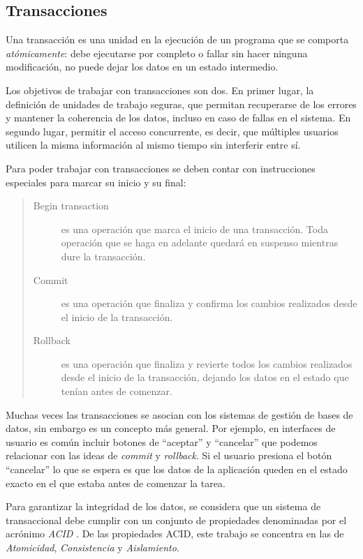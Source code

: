 \subsection{Transacciones}	

Una transacción es una unidad en la ejecución de un programa que se comporta 
\emph{atómicamente}: debe ejecutarse por completo o fallar sin hacer ninguna
modificación, no puede dejar los datos en un estado intermedio.

Los objetivos de trabajar con transacciones son dos.
En primer lugar, la definición de unidades de trabajo seguras, que permitan 
recuperarse de los errores y mantener la coherencia de los datos, incluso en caso de fallas en el sistema.
En segundo lugar, permitir el acceso concurrente, es decir, que múltiples
usuarios utilicen la misma información al mismo tiempo sin interferir entre sí.

\medskip
Para poder trabajar con transacciones se deben contar con instrucciones
especiales para marcar su inicio y su final:
\begin{quote}
	\label{ctxTransactional}
	\begin{description}
		\item[Begin transaction] es una operación que marca el inicio de una
		transacción. Toda operación que se haga en adelante quedará en suspenso
		mientras dure la transacción.
	
		\item[Commit] es una operación que finaliza y confirma los
		cambios realizados desde el inicio de la transacción. 
		
		\item[Rollback] es una operación que finaliza y revierte todos los cambios
		realizados desde el inicio de la transacción, 
		dejando los datos en el estado que tenían antes de comenzar.
	\end{description}
\end{quote}
   
\bigskip

Muchas veces las transacciones se asocian con los sistemas de gestión de bases
de datos, sin embargo es un concepto más general.
Por ejemplo, en interfaces de usuario es común incluir botones de
``aceptar'' y ``cancelar'' que podemos relacionar con las ideas de
\emph{commit} y \emph{rollback}. 
Si el usuario presiona el botón ``cancelar'' lo que se espera
es que los datos de la aplicación queden en el estado exacto en el que estaba
antes de comenzar la tarea.

\bigskip
\label{sec:ACID}
Para garantizar la integridad de los datos, se considera que un sistema de
transaccional debe cumplir con un conjunto de propiedades denominadas por el
acrónimo \emph{ACID} \cite{HaerderReuter83}.
De las propiedades ACID, este trabajo se concentra en las de \emph{Atomicidad},
\emph{Consistencia} y \emph{Aislamiento}. 

